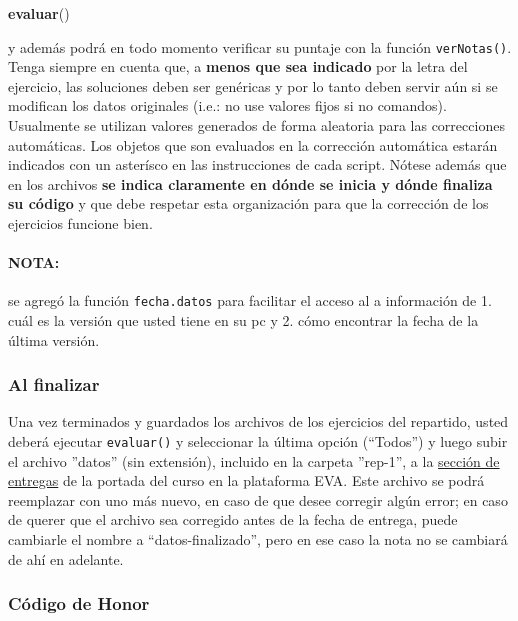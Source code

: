 \documentclass[]{article}
\newenvironment{Shaded}{}{}
\newcommand{\KeywordTok}[1]{\textcolor[rgb]{0.00,0.44,0.13}{\textbf{{#1}}}}
\newcommand{\NormalTok}[1]{{#1}}
\begin{document}
\begin{Shaded}
\begin{Highlighting}[]
\KeywordTok{evaluar}\NormalTok{()}
\end{Highlighting}
\end{Shaded}
y además podrá en todo momento verificar su puntaje con la función
\texttt{verNotas()}. Tenga siempre en cuenta que, a \textbf{menos que
sea indicado} por la letra del ejercicio, las soluciones deben ser
genéricas y por lo tanto deben servir aún si se modifican los datos
originales (i.e.: no use valores fijos si no comandos). Usualmente se
utilizan valores generados de forma aleatoria para las correcciones
automáticas. Los objetos que son evaluados en la corrección automática
estarán indicados con un asterísco en las instrucciones de cada script.
Nótese además que en los archivos \textbf{se indica claramente en dónde
se inicia y dónde finaliza su código} y que debe respetar esta
organización para que la corrección de los ejercicios funcione bien.

\paragraph{NOTA:}

se agregó la función \texttt{fecha.datos} para facilitar el acceso al a
información de 1. cuál es la versión que usted tiene en su pc y 2. cómo
encontrar la fecha de la última versión.

\subsubsection{Al finalizar}

Una vez terminados y guardados los archivos de los ejercicios del
repartido, usted deberá ejecutar \texttt{evaluar()} y seleccionar la
última opción (``Todos'') y luego subir el archivo ''datos'' (sin
extensión), incluido en la carpeta ''rep-1'', a la
\href{http://eva.universidad.edu.uy/mod/assign/view.php?id=103966}{sección
de entregas} de la portada del curso en la plataforma EVA. Este archivo
se podrá reemplazar con uno más nuevo, en caso de que desee corregir
algún error; en caso de querer que el archivo sea corregido antes de la
fecha de entrega, puede cambiarle el nombre a ``datos-finalizado'', pero
en ese caso la nota no se cambiará de ahí en adelante.

\subsubsection{Código de Honor}
\end{document}
